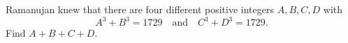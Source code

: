 Ramanujan knew that there are four different positive integers $A,B,C,D$ with
\[
A^3+B^3=1729\quad\text{and}\quad C^3+D^3=1729 .
\]
Find $A+B+C+D$.
